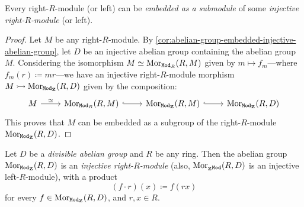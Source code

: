 \begin{theorem}
\label{thm:module-embedded-injective-module}
Every right-\(R\)-module (or left) can be \emph{embedded as a submodule} of some
\emph{injective right-\(R\)-module} (or left).
\end{theorem}

\begin{proof}
Let \(M\) be any right-\(R\)-module. By
\cref{cor:abelian-group-embedded-injective-abelian-group}, let \(D\) be an
injective abelian group containing the abelian group \(M\). Considering the
isomorphism \(M \simeq \operatorname{Mor}_{{\texttt{Mod}_{R}}}(R, M)\) given by \(m \mapsto f_m\)---where
\(f_m(r) \coloneq m r\)---we have an injective right-\(R\)-module morphism
\(M \rightarrowtail \operatorname{Mor}_{{\texttt{Mod}_{\mathbf{Z}}}}(R, D)\) given by the composition:
\[
\begin{tikzcd}
M \ar[r, "\dis"] &\Hom_{\rMod{R}}(R, M) \ar[r, hook]
&\Hom_{\rMod{\Z}}(R, M) \ar[r, hook]
&\Hom_{\rMod{\Z}}(R, D)
\end{tikzcd}
\]
This proves that \(M\) can be embedded as a subgroup of the right-\(R\)-module
\(\operatorname{Mor}_{{\texttt{Mod}_{\mathbf{Z}}}}(R, D)\).
\end{proof}

\begin{proposition}
\label{prop:abelian-grp-divisible-then-MorR-D-injective}
Let \(D\) be a \emph{divisible abelian group} and \(R\) be any ring. Then the
abelian group \(\operatorname{Mor}_{{\texttt{Mod}_{\mathbf{Z}}}}(R, D)\) is an \emph{injective
  right-\(R\)-module} (also, \(\operatorname{Mor}_{{{}_{\mathbf{Z}}\texttt{Mod}}}(R, D)\) is an injective
left-\(R\)-module), with a product
\[
(f \cdot r)(x) \coloneq f(r x)
\]
for every \(f \in \operatorname{Mor}_{{\texttt{Mod}_{\mathbf{Z}}}}(R, D)\), and \(r, x \in R\).
\end{proposition}

